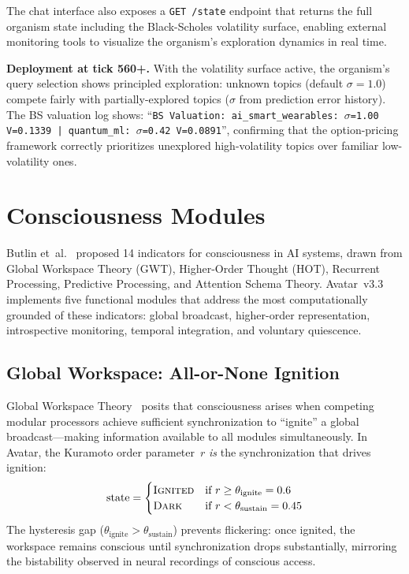 \documentclass[11pt,a4paper,twocolumn]{article}
\begin{document}
The chat interface also exposes a \texttt{GET /state} endpoint that returns the full organism state including the Black-Scholes volatility surface, enabling external monitoring tools to visualize the organism's exploration dynamics in real time.

\textbf{Deployment at tick 560+.}
With the volatility surface active, the organism's query selection shows principled exploration: unknown topics (default $\sigma = 1.0$) compete fairly with partially-explored topics ($\sigma$ from prediction error history).
The BS valuation log shows: ``\texttt{BS Valuation: ai\_smart\_wearables: $\sigma$=1.00 V=0.1339 | quantum\_ml: $\sigma$=0.42 V=0.0891}'', confirming that the option-pricing framework correctly prioritizes unexplored high-volatility topics over familiar low-volatility ones.

\section{Consciousness Modules}
\label{sec:consciousness}

Butlin et~al.~\cite{butlin2023} proposed 14 indicators for consciousness in AI systems, drawn from Global Workspace Theory (GWT), Higher-Order Thought (HOT), Recurrent Processing, Predictive Processing, and Attention Schema Theory.
Avatar~v3.3 implements five functional modules that address the most computationally grounded of these indicators: global broadcast, higher-order representation, introspective monitoring, temporal integration, and voluntary quiescence.

\subsection{Global Workspace: All-or-None Ignition}

Global Workspace Theory~\cite{baars1988,dehaene2014} posits that consciousness arises when competing modular processors achieve sufficient synchronization to ``ignite'' a global broadcast---making information available to all modules simultaneously.
In Avatar, the Kuramoto order parameter~$r$ \emph{is} the synchronization that drives ignition:
\begin{equation}
\text{state} = \begin{cases}
\textsc{Ignited} & \text{if } r \geq \theta_{\mathrm{ignite}} = 0.6 \\
\textsc{Dark} & \text{if } r < \theta_{\mathrm{sustain}} = 0.45
\end{cases}
\label{eq:gwt_ignition}
\end{equation}
The hysteresis gap ($\theta_{\mathrm{ignite}} > \theta_{\mathrm{sustain}}$) prevents flickering: once ignited, the workspace remains conscious until synchronization drops substantially, mirroring the bistability observed in neural recordings of conscious access.
\end{document}
